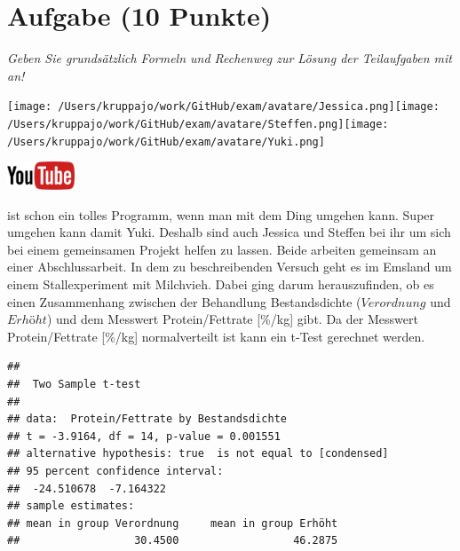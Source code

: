 \documentclass[a4paper, 9pt]{scrartcl}\usepackage[]{graphicx}\usepackage[]{xcolor}
\makeatletter
\newenvironment{kframe}{%
 \def\at@end@of@kframe{}%
 \ifinner\ifhmode%
  \def\at@end@of@kframe{\end{minipage}}%
  \begin{minipage}{\columnwidth}%
 \fi\fi%
 \def\FrameCommand##1{\hskip\@totalleftmargin \hskip-\fboxsep
 \colorbox{shadecolor}{##1}\hskip-\fboxsep
     \hskip-\linewidth \hskip-\@totalleftmargin \hskip\columnwidth}%
 \MakeFramed {\advance\hsize-\width
   \@totalleftmargin\z@ \linewidth\hsize
   \@setminipage}}%
 {\par\unskip\endMakeFramed%
 \at@end@of@kframe}
\newenvironment{knitrout}{}{} %
\makeatother
\begin{document}
 
\clearpage

\section{Aufgabe \hfill (10 Punkte)}

\textit{Geben Sie grundsätzlich Formeln und Rechenweg zur Lösung der Teilaufgaben mit an!} \\[1Ex]
 

 
\begin{minipage}[t]{0.5\textwidth}
\texttt{[image: /Users/kruppajo/work/GitHub/exam/avatare/Jessica.png]}\hspace{-4mm}\texttt{[image: /Users/kruppajo/work/GitHub/exam/avatare/Steffen.png]}\hspace{-4mm}\texttt{[image: /Users/kruppajo/work/GitHub/exam/avatare/Yuki.png]}
\end{minipage}
\begin{minipage}[t]{0.5\textwidth}
\hfill
\href{https://youtu.be/exDo7AyHl4Q}{\includegraphics[width = 2cm]{img/youtube}}
\end{minipage}
\vspace{1ex}



\Rlogo ist schon ein tolles Programm, wenn man mit dem Ding umgehen kann. Super umgehen kann damit Yuki. Deshalb sind auch Jessica und Steffen bei ihr um sich bei einem gemeinsamen Projekt helfen zu lassen. Beide arbeiten gemeinsam an einer Abschlussarbeit. In dem zu beschreibenden Versuch geht es im Emsland um einem Stallexperiment mit Milchvieh. Dabei ging darum herauszufinden, ob es einen Zusammenhang zwischen der Behandlung Bestandsdichte ($Verordnung$ und $Erhöht$) und dem Messwert Protein/Fettrate [\%/kg] gibt. Da der Messwert Protein/Fettrate [\%/kg] normalverteilt ist kann ein t-Test gerechnet werden.

\begin{knitrout}
\color{fgcolor}\begin{kframe}
\begin{verbatim}
## 
## 	Two Sample t-test
## 
## data:  Protein/Fettrate by Bestandsdichte
## t = -3.9164, df = 14, p-value = 0.001551
## alternative hypothesis: true  is not equal to [condensed]
## 95 percent confidence interval:
##  -24.510678  -7.164322
## sample estimates:
## mean in group Verordnung     mean in group Erhöht 
##                  30.4500                  46.2875
\end{verbatim}
\end{kframe}
\end{knitrout}
\end{document}
